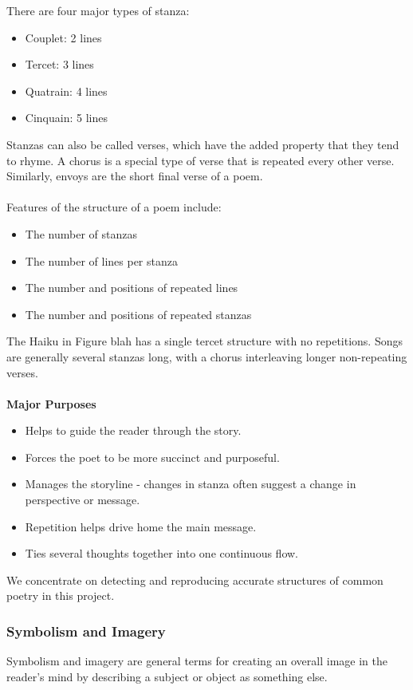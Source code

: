 There are four major types of stanza:
\begin{itemize}
\item{Couplet: 2 lines}
\item{Tercet: 3 lines}
\item{Quatrain: 4 lines}
\item{Cinquain: 5 lines}
\end{itemize}

Stanzas can also be called verses, which have the added property that they tend to rhyme. A chorus is a special type of verse that is repeated every other verse. Similarly, envoys are the short final verse of a poem.
\\\\
Features of the structure of a poem include:
\begin{itemize}
\item{The number of stanzas}
\item{The number of lines per stanza}
\item{The number and positions of repeated lines}
\item{The number and positions of repeated stanzas}
\end{itemize} 

The Haiku in Figure blah has a single tercet structure with no repetitions. Songs are generally several stanzas long, with a chorus interleaving longer non-repeating verses.
\\\\
\textbf{Major Purposes}
\begin{itemize}
\item{Helps to guide the reader through the story.}
\item{Forces the poet to be more succinct and purposeful.}
\item{Manages the storyline - changes in stanza often suggest a change in perspective or message.}
\item{Repetition helps drive home the main message.}
\item{Ties several thoughts together into one continuous flow.}
\end{itemize} 

We concentrate on detecting and reproducing accurate structures of common poetry in this project.

\subsubsection{Symbolism and Imagery}
Symbolism and imagery are general terms for creating an overall image in the reader's mind by describing a subject or object as something else.

